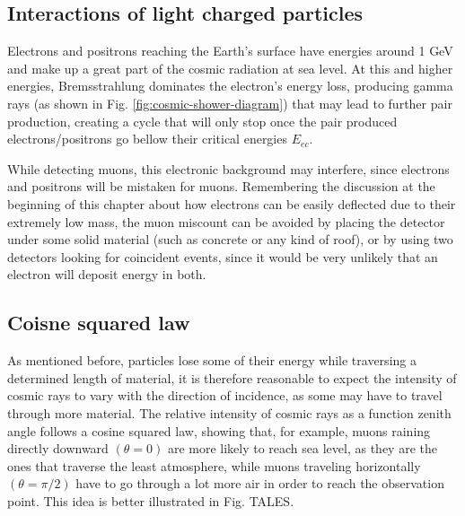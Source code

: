 \subsection{Interactions of light charged particles}

Electrons and positrons reaching the Earth's surface have energies around 1 \unit{\giga\eV} and make up a great part of the cosmic radiation at sea level. At this and higher energies, Bremsstrahlung dominates the electron's energy loss, producing gamma rays (as shown in Fig. \ref{fig:cosmic-shower-diagram}) that may lead to further pair production, creating a cycle that will only stop once the pair produced electrons/positrons go bellow their critical energies $E_{ec}$. 

While detecting muons, this electronic background may interfere, since electrons and positrons will be mistaken for muons. Remembering the discussion at the beginning of this chapter about how electrons can be easily deflected due to their extremely low mass, the muon miscount can be avoided by placing the detector under some solid material (such as concrete or any kind of roof), or by using two detectors looking for coincident events, since it would be very unlikely that an electron will deposit energy in both.

\subsection{Coisne squared law}

As mentioned before, particles lose some of their energy while traversing a determined length of material, it is therefore reasonable to expect the intensity of cosmic rays to vary with the direction of incidence, as some may have to travel through more material. The relative intensity of cosmic rays as a function zenith angle follows a cosine squared law, showing that, for example, muons raining directly downward $(\theta=0)$ are more likely to reach sea level, as they are the ones that traverse the least atmosphere, while muons traveling horizontally $(\theta=\pi/2)$ have to go through a lot more air in order to reach the observation point. This idea is better illustrated in Fig. TALES.